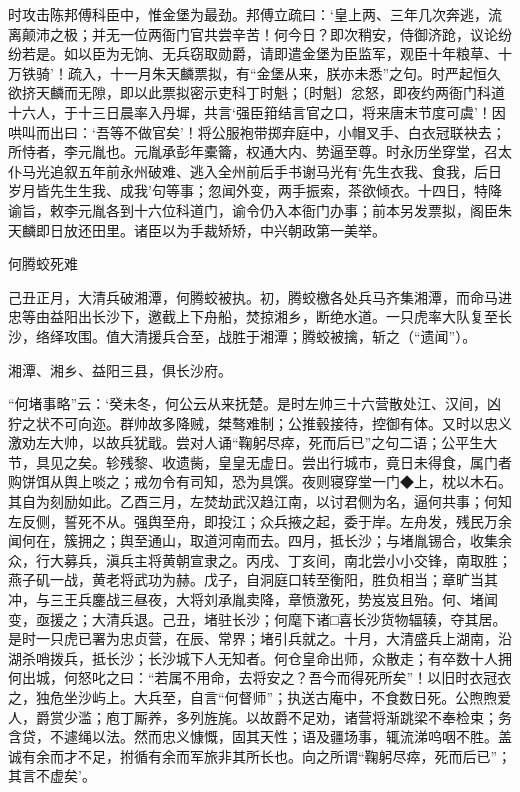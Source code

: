 \documentclass[]{article}
\begin{document}
时攻击陈邦傅科臣中，惟金堡为最劲。邦傅立疏曰：`皇上两、三年几次奔逃，流离颠沛之极；并无一位两衙门官共尝辛苦！何今日？即次稍安，侍御济跄，议论纷纷若是。如以臣为无饷、无兵窃取勋爵，请即遣金堡为臣监军，观臣十年粮草、十万铁骑'！疏入，十一月朱天麟票拟，有``金堡从来，朕亦未悉''之句。时严起恒久欲挤天麟而无隙，即以此票拟密示吏科丁时魁；〔时魁〕忿怒，即夜约两衙门科道十六人，于十三日晨率入丹墀，共言`强臣箝结言官之口，将来唐末节度可虞'！因哄叫而出曰：`吾等不做官矣'！将公服袍带掷弃庭中，小帽叉手、白衣冠联袂去；所恃者，李元胤也。元胤承彭年橐籥，权通大内、势逼至尊。时永历坐穿堂，召太仆马光追叙五年前永州破难、逃入全州前后手书谢马光有`先生衣我、食我，后日岁月皆先生生我、成我'句等事；忽闻外变，两手振索，茶欲倾衣。十四日，特降谕旨，敕李元胤各到十六位科道门，谕令仍入本衙门办事；前本另发票拟，阁臣朱天麟即日放还田里。诸臣以为手裁矫矫，中兴朝政第一美举。

何腾蛟死难

己丑正月，大清兵破湘潭，何腾蛟被执。初，腾蛟檄各处兵马齐集湘潭，而命马进忠等由益阳出长沙下，邀截上下舟船，焚掠湘乡，断绝水道。一只虎率大队复至长沙，络绎攻围。值大清援兵合至，战胜于湘潭；腾蛟被擒，斩之（``遗闻''）。

湘潭、湘乡、益阳三县，俱长沙府。

``何堵事略''云：`癸未冬，何公云从来抚楚。是时左帅三十六营散处江、汉间，凶狞之状不可向迩。群帅故多降贼，桀骜难制；公推毂接待，控御有体。又时以忠义激劝左大帅，以故兵犹戢。尝对人诵``鞠躬尽瘁，死而后已''之句二语；公平生大节，具见之矣。轸残黎、收遗胔，皇皇无虚日。尝出行城市，竟日未得食，属门者购饼饵从舆上啖之；戒勿令有司知，恐为具馔。夜则寝穿堂一门◆上，枕以木石。其自为刻励如此。乙酉三月，左焚劫武汉趋江南，以讨君侧为名，逼何共事；何知左反侧，誓死不从。强舆至舟，即投江；众兵掖之起，委于岸。左舟发，残民万余闻何在，簇拥之；舆至通山，取道河南而去。四月，抵长沙；与堵胤锡合，收集余众，行大募兵，滇兵主将黄朝宣隶之。丙戌、丁亥间，南北尝小小交锋，南取胜；燕子矶一战，黄老将武功为赫。戊子，自洞庭口转至衡阳，胜负相当；章旷当其冲，与三王兵鏖战三昼夜，大将刘承胤卖降，章愤激死，势岌岌且殆。何、堵闻变，亟援之；大清兵退。己丑，堵驻长沙；何麾下诸□喜长沙货物辐辏，夺其居。是时一只虎已署为忠贞营，在辰、常界；堵引兵就之。十月，大清盛兵上湖南，沿湖杀哨拨兵，抵长沙；长沙城下人无知者。何仓皇命出师，众散走；有卒数十人拥何出城，何怒叱之曰：``若属不用命，去将安之？吾今而得死所矣''！以旧时衣冠衣之，独危坐沙屿上。大兵至，自言``何督师''；执送古庵中，不食数日死。公煦煦爱人，爵赏少滥；庖丁厮养，多列旌旄。以故爵不足劝，诸营将渐跳梁不奉检束；务含贷，不遽绳以法。然而忠义慷慨，固其天性；语及疆场事，辄流涕呜咽不胜。盖诚有余而才不足，拊循有余而军旅非其所长也。向之所谓``鞠躬尽瘁，死而后已''；其言不虚矣'。
\end{document}
